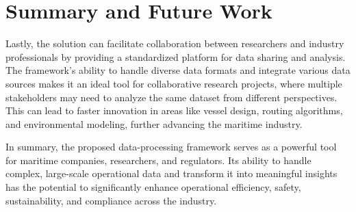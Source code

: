\chapter{Summary and Future Work} \label{chap:futurework}


Lastly, the solution can facilitate collaboration between researchers and industry professionals by providing a standardized platform for data sharing and analysis. The framework’s ability to handle diverse data formats and integrate various data sources makes it an ideal tool for collaborative research projects, where multiple stakeholders may need to analyze the same dataset from different perspectives. This can lead to faster innovation in areas like vessel design, routing algorithms, and environmental modeling, further advancing the maritime industry.

In summary, the proposed data-processing framework serves as a powerful tool for maritime companies, researchers, and regulators. Its ability to handle complex, large-scale operational data and transform it into meaningful insights has the potential to significantly enhance operational efficiency, safety, sustainability, and compliance across the industry.